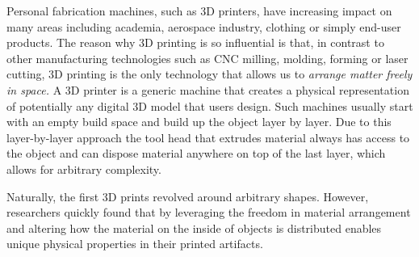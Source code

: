 Personal fabrication machines, such as 3D printers, have increasing impact on many areas including academia, aerospace industry, clothing or simply end-user products. The reason why 3D printing is so influential is that, in contrast to other manufacturing technologies such as CNC milling, molding, forming or laser cutting, 3D printing is the only technology that allows us to \textit{arrange matter freely in space.} A 3D printer is a generic machine that creates a physical representation of potentially any digital 3D model that users design. Such machines usually start with an empty build space and build up the object layer by layer. Due to this layer-by-layer approach the tool head that extrudes material always has access to the object and can dispose material anywhere on top of the last layer, which allows for arbitrary complexity. 

Naturally, the first 3D prints revolved around arbitrary shapes. However, researchers quickly found that by leveraging the freedom in material arrangement and altering how the material on the inside of objects is distributed enables unique physical properties in their printed artifacts.





